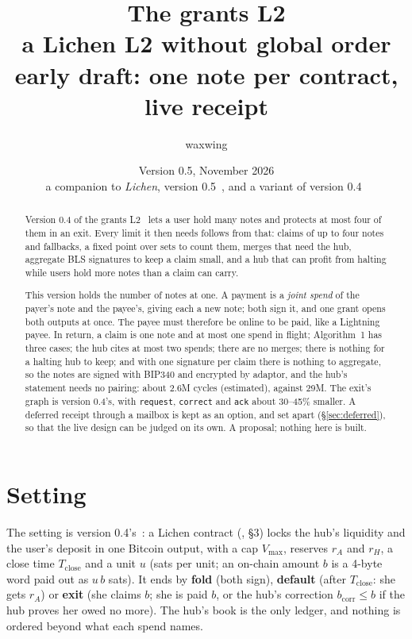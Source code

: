 \documentclass[11pt]{article}
\title{\textbf{The grants L2}\\a Lichen L2 without global order\\[2pt]\large early draft: one note per contract, live receipt}
\author{waxwing}
\date{Version 0.5, November 2026\\[2pt]\small a companion to \emph{Lichen}, version 0.5~\cite{lichen}, and a variant of version 0.4~\cite{grants04}}
\theoremstyle{plain}
\theoremstyle{definition}
\newcommand{\vmax}{V_{\max}}
\newcommand{\Tc}{T_{\mathrm{close}}}
\newcommand{\bcorr}{b_{\mathrm{corr}}}
\newcommand{\tx}[1]{\texttt{#1}}
\begin{document}
\maketitle

\begin{abstract}
Version 0.4 of the grants L2~\cite{grants04} lets a user hold many notes
and protects at most four of them in an exit. Every limit it then needs
follows from that: claims of up to four notes and fallbacks, a fixed
point over sets to count them, merges that need the hub, aggregate BLS
signatures to keep a claim small, and a hub that can profit from
halting while users hold more notes than a claim can carry.

This version holds the number of notes at one. A payment is a
\emph{joint spend} of the payer's note and the payee's, giving each a
new note; both sign it, and one grant opens both outputs at once. The
payee must therefore be online to be paid, like a Lightning payee. In
return, a claim is one note and at most one spend in flight; Algorithm~1
has three cases; the hub cites at most two spends; there are no merges;
there is nothing for a halting hub to keep; and with one signature per
claim there is nothing to aggregate, so the notes are signed with BIP340
and encrypted by adaptor, and the hub's statement needs no pairing:
about 2.6M cycles (estimated), against 29M. The exit's graph is version
0.4's, with \tx{request}, \tx{correct} and \tx{ack} about 30--45\%
smaller. A deferred receipt through a mailbox is kept as an option, and
set apart (\S\ref{sec:deferred}), so that the live design can be judged
on its own. A proposal; nothing here is built.
\end{abstract}

\tableofcontents

\section{Setting}

The setting is version 0.4's~\cite{grants04}: a Lichen contract
(\cite{lichen}, \S3) locks the hub's liquidity and the user's deposit in
one Bitcoin output, with a cap $\vmax$, reserves $r_A$ and $r_H$, a
close time $\Tc$ and a unit $u$ (sats per unit; an on-chain amount $b$
is a 4-byte word paid out as $u\,b$ sats). It ends by \textbf{fold}
(both sign), \textbf{default} (after $\Tc$: she gets $r_A$) or
\textbf{exit} (she claims $b$; she is paid $b$, or the hub's correction
$\bcorr \le b$ if the hub proves her owed no more). The hub's book is the
only ledger, and nothing is ordered beyond what each spend names.
\end{document}
